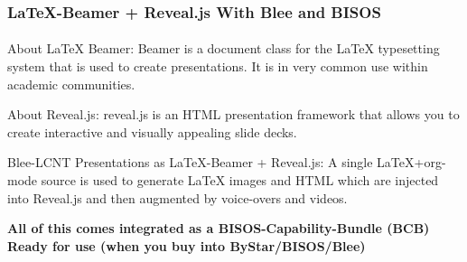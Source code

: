 \begin{whenOrg}
\begin{verblatex}

\begin{frame}[fragile,plain,label=beamerPlusReveal]
    \frametitle{LaTeX-Beamer + Reveal.js With Blee and BISOS}
    \framesubtitle{}


    \begin{block}{About LaTeX Beamer:}
      Beamer is a document class for the LaTeX typesetting system that is used to create presentations.
      It is in very common use within academic communities.
    \end{block}

    \begin{block}{About Reveal.js:}
          reveal.js is an HTML presentation framework that allows you to create interactive and visually appealing slide decks.
    \end{block}

    \begin{exampleblock}{Blee-LCNT Presentations as LaTeX-Beamer + Reveal.js:}
          A single LaTeX+org-mode source is used to generate LaTeX images and HTML which are injected into Reveal.js and
          then augmented by voice-overs and videos.
    \end{exampleblock}

    \begin{center}
      \colorbox{blue!30}{\color{black}
       \textbf{All of this comes integrated as a BISOS-Capability-Bundle (BCB)}}
      \colorbox{blue!30}{\color{black}
       \textbf{Ready for use (when you buy into ByStar/BISOS/Blee)}}
    \end{center}

\end{frame}
\end{verblatex}
\end{whenOrg}
